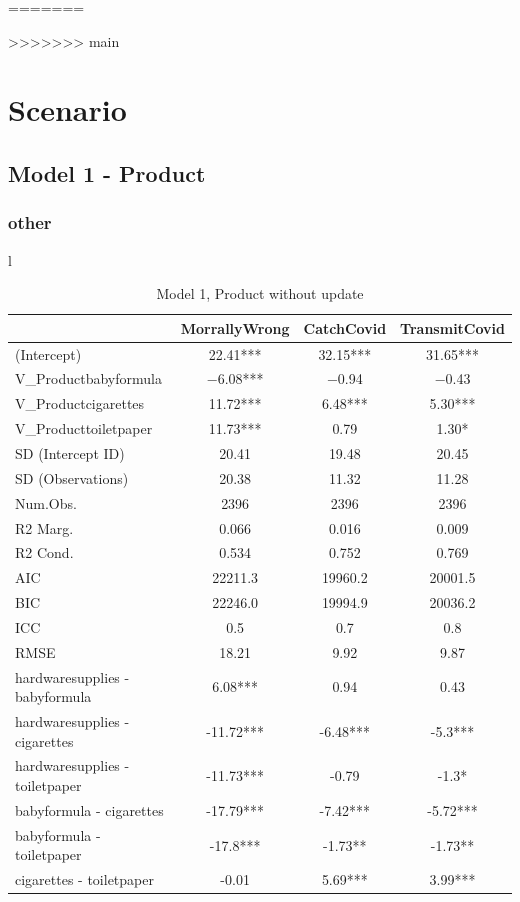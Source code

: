 \documentclass[]{report}
\begin{document}
=======
	
	\begin{abstract}
		
	\end{abstract}


>>>>>>> main
\part{Scenario}


\chapter{Model 1 - Product}

\section{other}
l

\begin{table}
	
	\caption{Model 1, Product without update}
	\centering
	\begin{tabular}[t]{lccc}
		\toprule
		& MorrallyWrong & CatchCovid & TransmitCovid\\
		\midrule
		(Intercept) & \num{22.41}*** & \num{32.15}*** & \num{31.65}***\\
		V\_Productbabyformula & \num{-6.08}*** & \num{-0.94} & \num{-0.43}\\
		V\_Productcigarettes & \num{11.72}*** & \num{6.48}*** & \num{5.30}***\\
		V\_Producttoiletpaper & \num{11.73}*** & \num{0.79} & \num{1.30}*\\
		SD (Intercept ID) & \num{20.41} & \num{19.48} & \num{20.45}\\
		SD (Observations) & \num{20.38} & \num{11.32} & \num{11.28}\\
		\midrule
		Num.Obs. & \num{2396} & \num{2396} & \num{2396}\\
		R2 Marg. & \num{0.066} & \num{0.016} & \num{0.009}\\
		R2 Cond. & \num{0.534} & \num{0.752} & \num{0.769}\\
		AIC & \num{22211.3} & \num{19960.2} & \num{20001.5}\\
		BIC & \num{22246.0} & \num{19994.9} & \num{20036.2}\\
		ICC & \num{0.5} & \num{0.7} & \num{0.8}\\
		RMSE & \num{18.21} & \num{9.92} & \num{9.87}\\
		\toprule
hardwaresupplies - babyformula & 6.08*** & 0.94 & 0.43 \\ 
hardwaresupplies - cigarettes & -11.72*** & -6.48*** & -5.3*** \\ 
hardwaresupplies - toiletpaper & -11.73*** & -0.79 & -1.3* \\ 
babyformula - cigarettes & -17.79*** & -7.42*** & -5.72*** \\ 
babyformula - toiletpaper & -17.8*** & -1.73** & -1.73** \\ 
cigarettes - toiletpaper & -0.01 & 5.69*** & 3.99*** \\ 
		\bottomrule
	\end{tabular}
\end{table}
\end{document}
